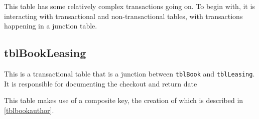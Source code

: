 \documentclass[11pt,a4paper]{scrartcl}
\begin{document}
	This table has some relatively complex transactions going on. To begin with, it is interacting with transactional and non-transactional tables, with transactions happening in a junction table.
	
	\subsection{tblBookLeasing}\label{tblbookleasing}
	
	This is a transactional table that is a junction between \texttt{tblBook} and \texttt{tblLeasing}. It is responsible for documenting the checkout and return date 
	
	
	
	This table makes use of a composite key, the creation of which is described in \ref{tblbookauthor}. 
\end{document}

